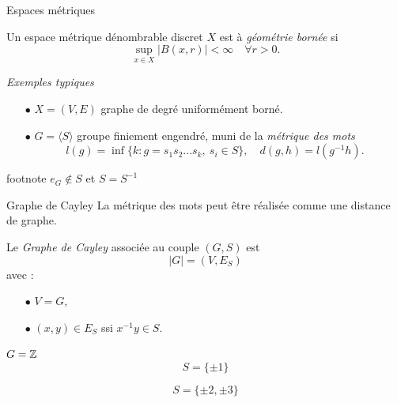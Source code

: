 \begin{frame}{Espaces m\'etriques}
\begin{definition}
Un espace m\'etrique d\'enombrable discret  $X$ est \`a \textit{g\'eom\'etrie born\'ee} si
\[\sup_{x\in X} | B(x,r)| < \infty \quad \forall r >0.\]
\end{definition}
\textit{Exemples typiques}\\
\vfill
\begin{itemize}
\item[$\bullet$] $X=(V,E)$ graphe de degr\'e uniform\'ement born\'e.
\vfill
\item[$\bullet$] $G=\langle S \rangle$ groupe finiement engendr\'e, muni de la \textit{m\'etrique des mots}\\
\[l(g) = \inf\{k : g = s_1 s_2 ... s_k , \ s_i \in S\}, \quad d(g,h) = l(g^{-1}h).\]
\end{itemize}
\vfill
footnote  $e_G\notin S$ et $S=S^{-1}$
\end{frame}

\begin{frame}{Graphe de Cayley}
La m\'etrique des mots peut \^{e}tre r\'ealis\'ee comme une distance de graphe.\\
\vfill
\begin{definition}
Le \textit{Graphe de Cayley} associ\'ee au couple $(G,S)$ est 
\[|G| = (V,E_S)\]
avec : 
\vfill
\begin{itemize}
\item[$\bullet$] $V=G$,
\vfill
\item[$\bullet$] $(x,y)\in E_S$ ssi $x^{-1}y\in S$.
\end{itemize}
\end{definition}
\vfill
\end{frame}

\begin{frame}{$G=\mathbb Z$}
\[S= \{\pm 1\}\]
\[S= \{\pm 2 , \pm 3\}\]
\end{frame}


